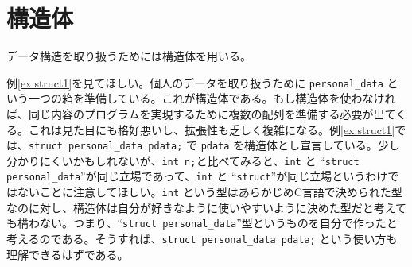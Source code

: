 \section{構造体}
データ構造を取り扱うためには構造体を用いる。

例\ref{ex:struct1}を見てほしい。個人のデータを取り扱うために \texttt{personal\_data} という一つの箱を準備している。これが構造体である。もし構造体を使わなければ、同じ内容のプログラムを実現するために複数の配列を準備する必要が出てくる。これは見た目にも格好悪いし、拡張性も乏しく複雑になる。例\ref{ex:struct1}では、\texttt{struct personal\_data pdata;} で \texttt{pdata} を構造体とし宣言している。少し分かりにくいかもしれないが、\texttt{int n;}と比べてみると、\texttt{int} と ``\texttt{struct personal\_data}''が同じ立場であって、\texttt{int} と ``\texttt{struct}''が同じ立場というわけではないことに注意してほしい。\texttt{int} という型はあらかじめC言語で決められた型なのに対し、構造体は自分が好きなように使いやすいように決めた型だと考えても構わない。つまり、``\texttt{struct personal\_data}''型というものを自分で作ったと考えるのである。そうすれば、\texttt{struct personal\_data pdata;} という使い方も理解できるはずである。

